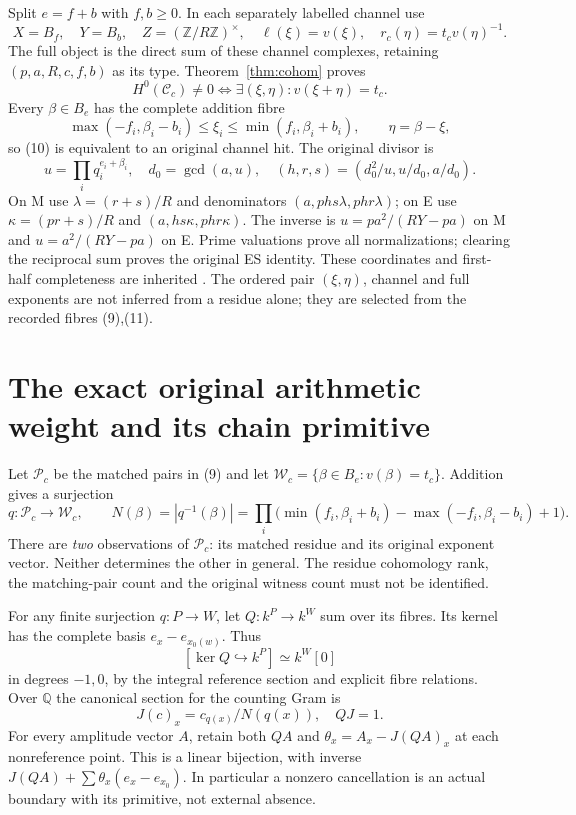 Split $e=f+b$ with $f,b\ge0$. In each separately labelled channel use
\[
 X=B_f,\quad Y=B_b,\quad Z=(\mathbb Z/R\mathbb Z)^\times,
 \quad \ell(\xi)=v(\xi),\quad r_c(\eta)=t_cv(\eta)^{-1}.       \tag{9}
\]
The full object is the direct sum of these channel complexes, retaining
$(p,a,R,c,f,b)$ as its type. Theorem~\ref{thm:cohom} proves
\[
 H^0(\mathcal C_c)\ne0
 \iff \exists(\xi,\eta):v(\xi+\eta)=t_c.             \tag{10}
\]
Every $\beta\in B_e$ has the complete addition fibre
\[
 \max(-f_i,\beta_i-b_i)\le\xi_i\le\min(f_i,\beta_i+b_i),
 \qquad \eta=\beta-\xi,                             \tag{11}
\]
so (10) is equivalent to an original channel hit. The original divisor is
\[
 u=\prod_iq_i^{e_i+\beta_i},\quad d_0=\gcd(a,u),\quad
 (h,r,s)=(d_0^2/u,u/d_0,a/d_0).                       \tag{12}
\]
On M use $\lambda=(r+s)/R$ and denominators
$(a,phs\lambda,phr\lambda)$; on E use $\kappa=(pr+s)/R$ and
$(a,hs\kappa,phr\kappa)$. The inverse is
$u=pa^2/(RY-pa)$ on M and $u=a^2/(RY-pa)$ on E.
Prime valuations prove all normalizations; clearing the reciprocal sum
proves the original ES identity. These coordinates and first-half
completeness are inherited \cite{ET,ESBase,Split}. The ordered pair
$(\xi,\eta)$, channel and full exponents are not inferred from a residue
alone; they are selected from the recorded fibres (9),(11).

\section{The exact original arithmetic weight and its chain primitive}
Let $\mathscr P_c$ be the matched pairs in (9) and let
$\mathscr W_c=\{\beta\in B_e:v(\beta)=t_c\}$. Addition gives a surjection
\[
 q:\mathscr P_c\to\mathscr W_c,
 \qquad N(\beta)=|q^{-1}(\beta)|
 =\prod_i\bigl(\min(f_i,\beta_i+b_i)-\max(-f_i,\beta_i-b_i)+1\bigr).\tag{13}
\]
There are \emph{two} observations of $\mathscr P_c$: its matched residue
and its original exponent vector. Neither determines the other in general.
The residue cohomology rank, the matching-pair count and the original
witness count must not be identified.

For any finite surjection $q:P\to W$, let $Q:k^P\to k^W$ sum over its
fibres. Its kernel has the complete basis $e_x-e_{x_0(w)}$. Thus
\[
 [\ker Q\hookrightarrow k^P]\simeq k^W[0]          \tag{14}
\]
in degrees $-1,0$, by the integral reference section and explicit fibre relations. Over
$\mathbb Q$ the canonical section for the counting Gram is
\[
 J(c)_x=c_{q(x)}/N(q(x)),\quad QJ=1.                 \tag{15}
\]
For every amplitude vector $A$, retain both $QA$ and
$\theta_x=A_x-J(QA)_x$ at each nonreference point. This is a linear
bijection, with inverse $J(QA)+\sum\theta_x(e_x-e_{x_0})$.
In particular a nonzero cancellation is an actual boundary with its
primitive, not external absence.

